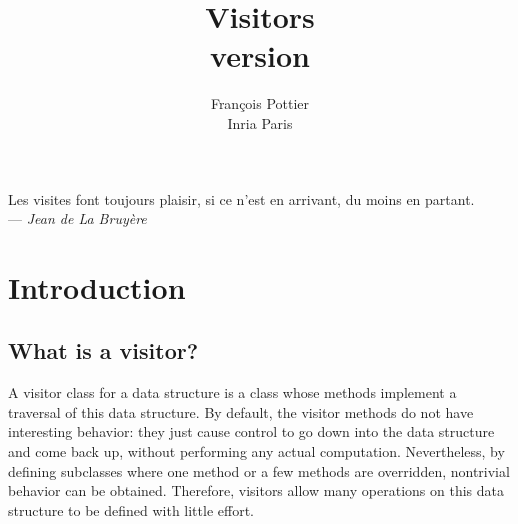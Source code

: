 \documentclass[11pt,a4paper,twoside]{article}
\title{Visitors\\\normalsize version \visitorsversion}
\date{}
\begin{document}
\author{François Pottier\\ Inria Paris\\ }
\maketitle


\clearpage
\tableofcontents
\clearpage


\begin{flushright}
  Les visites font toujours plaisir, si ce n'est en arrivant, du moins en
  partant. \\ --- \textit{Jean de La Bruyère}
\end{flushright}

\vspace{8mm}


\section{Introduction}
\label{sec:intro}


\subsection{What is a visitor?}

A visitor class for a data structure is a class whose methods implement a
traversal of this data structure. By default, the visitor methods do not have
interesting behavior: they just cause control to go down into the data
structure and come back up, without performing any actual computation.
Nevertheless, by defining subclasses where one method or a few methods are
overridden, nontrivial behavior can be obtained. Therefore, visitors allow
many operations on this data structure to be defined with little effort.
\end{document}
